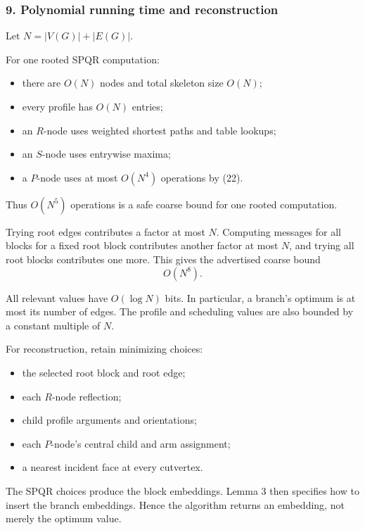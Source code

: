 \documentclass[
  11pt,
  a4paper,
]{article}
\providecommand{\tightlist}{%
  \setlength{\itemsep}{0pt}\setlength{\parskip}{0pt}}
\begin{document}
\subsubsection{9. Polynomial running time and
reconstruction}\label{polynomial-running-time-and-reconstruction}

Let \(N=|V(G)|+|E(G)|\).

For one rooted SPQR computation:

\begin{itemize}
\tightlist
\item
  there are \(O(N)\) nodes and total skeleton size \(O(N)\);
\item
  every profile has \(O(N)\) entries;
\item
  an \(R\)-node uses weighted shortest paths and table lookups;
\item
  an \(S\)-node uses entrywise maxima;
\item
  a \(P\)-node uses at most \(O(N^4)\) operations by (22).
\end{itemize}

Thus \(O(N^5)\) operations is a safe coarse bound for one rooted
computation.

Trying root edges contributes a factor at most \(N\). Computing messages
for all blocks for a fixed root block contributes another factor at most
\(N\), and trying all root blocks contributes one more. This gives the
advertised coarse bound \[
O(N^8).
\]

All relevant values have \(O(\log N)\) bits. In particular, a branch's
optimum is at most its number of edges. The profile and scheduling
values are also bounded by a constant multiple of \(N\).

For reconstruction, retain minimizing choices:

\begin{itemize}
\tightlist
\item
  the selected root block and root edge;
\item
  each \(R\)-node reflection;
\item
  child profile arguments and orientations;
\item
  each \(P\)-node's central child and arm assignment;
\item
  a nearest incident face at every cutvertex.
\end{itemize}

The SPQR choices produce the block embeddings. Lemma 3 then specifies
how to insert the branch embeddings. Hence the algorithm returns an
embedding, not merely the optimum value.
\end{document}
